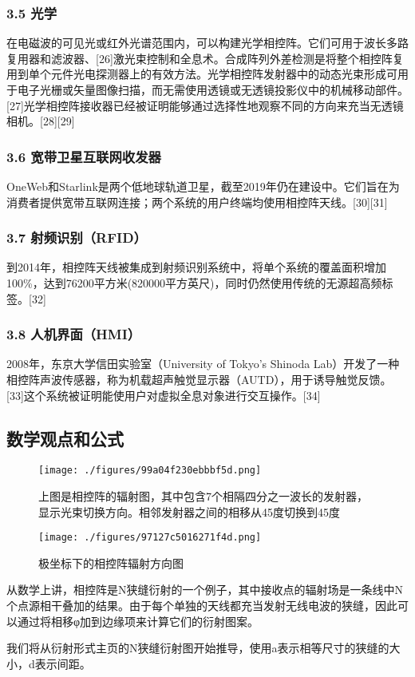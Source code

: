 \subsubsection{3.5 光学}
在电磁波的可见光或红外光谱范围内，可以构建光学相控阵。它们可用于波长多路复用器和滤波器、[26]激光束控制和全息术。合成阵列外差检测是将整个相控阵复用到单个元件光电探测器上的有效方法。光学相控阵发射器中的动态光束形成可用于电子光栅或矢量图像扫描，而无需使用透镜或无透镜投影仪中的机械移动部件。[27]光学相控阵接收器已经被证明能够通过选择性地观察不同的方向来充当无透镜相机。[28][29]

\subsubsection{3.6 宽带卫星互联网收发器}
OneWeb和Starlink是两个低地球轨道卫星，截至2019年仍在建设中。它们旨在为消费者提供宽带互联网连接；两个系统的用户终端均使用相控阵天线。[30][31]

\subsubsection{3.7 射频识别（RFID）}
到2014年，相控阵天线被集成到射频识别系统中，将单个系统的覆盖面积增加100\%，达到76200平方米(820000平方英尺)，同时仍然使用传统的无源超高频标签。[32]

\subsubsection{3.8 人机界面（HMI）}
2008年，东京大学信田实验室（University of Tokyo's Shinoda Lab）开发了一种相控阵声波传感器，称为机载超声触觉显示器（AUTD），用于诱导触觉反馈。[33]这个系统被证明能使用户对虚拟全息对象进行交互操作。[34]

\subsection{数学观点和公式}
\begin{figure}[ht]
\centering
\texttt{[image: ./figures/99a04f230ebbbf5d.png]}
\caption{上图是相控阵的辐射图，其中包含7个相隔四分之一波长的发射器，显示光束切换方向。相邻发射器之间的相移从45度切换到45度} \label{fig_XKZ_10}
\end{figure}
\begin{figure}[ht]
\centering
\texttt{[image: ./figures/97127c5016271f4d.png]}
\caption{极坐标下的相控阵辐射方向图} \label{fig_XKZ_11}
\end{figure}

从数学上讲，相控阵是N狭缝衍射的一个例子，其中接收点的辐射场是一条线中N个点源相干叠加的结果。由于每个单独的天线都充当发射无线电波的狭缝，因此可以通过将相移φ加到边缘项来计算它们的衍射图案。

我们将从衍射形式主页的N狭缝衍射图开始推导，使用a表示相等尺寸的狭缝的大小，d表示间距。